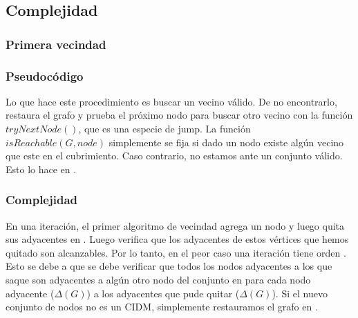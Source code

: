 \subsection{Complejidad}

\subsubsection{Primera vecindad}

\subsubsection*{Pseudocódigo}

\begin{algorithmic}
	\EndIf
	
	
		\EndIf
		
		
				\EndWhile
			\EndIf
		\EndFor
	\EndFor
	
\EndFor
\EndProcedure

\end{algorithmic}

Lo que hace este procedimiento es buscar un vecino válido. De no encontrarlo, restaura el grafo y prueba el próximo nodo para buscar otro vecino con la función $tryNextNode()$, que es una especie de jump. La función $isReachable(G, node)$ simplemente se fija si dado un nodo existe algún vecino que este en el cubrimiento. Caso contrario, no estamos ante un conjunto válido. Esto lo hace en .

\subsubsection*{Complejidad}

En una iteración, el primer algoritmo de vecindad agrega un nodo y luego quita sus adyacentes en . Luego verifica que los adyacentes de estos vértices que hemos quitado son alcanzables. Por lo tanto, en el peor caso una iteración tiene orden . Esto se debe a que se debe verificar que todos los nodos adyacentes a los que saque son adyacentes a algún otro nodo del conjunto en  para cada nodo adyacente ($\Delta(G)$) a los adyacentes que pude quitar ($\Delta(G)$). Si el nuevo conjunto de nodos no es un CIDM, simplemente restauramos el grafo en .


